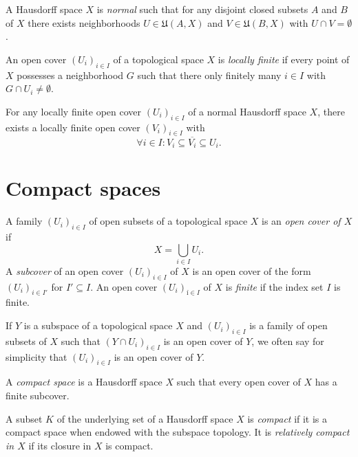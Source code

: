 \begin{dfn}
  A Hausdorff space $X$ is \emph{normal} such that for any disjoint closed
  subsets $A$ and $B$ of $X$ there exists neighborhoods $U \in \mathfrak U(A, X)$
  and $V \in \mathfrak U(B, X)$ with $U \cap V = \emptyset$.
\end{dfn}

An open cover $(U_i)_{i \in I}$ of a topological space $X$ is \emph{locally finite}
if every point of $X$ possesses a neighborhood $G$ such that there only finitely
many $i \in I$ with $G \cap U_i \neq \emptyset$.
\begin{thm}
  \label{prop:shrinking_lemma}
  For any locally finite open cover $(U_i)_{i \in I}$ of a normal Hausdorff space $X$, there
  exists a locally finite open cover $(V_i)_{i \in I}$ with
  \[
    \forall i \in I : V_i \subseteq \overline{V_i} \subseteq U_i.
  \]
\end{thm}



\section{Compact spaces}
\label{sec:compact}

A family $(U_i)_{i \in I}$ of open subsets of a topological space $X$ is an
\emph{open cover of $X$} if
\[
  X = \bigcup_{i \in I} U_i.
\]
A \emph{subcover} of an open cover $(U_i)_{i \in I}$ of $X$
is an open cover of the form $(U_i)_{i \in I'}$ for $I' \subseteq I$. An open
cover $(U_i)_{í \in I}$ of $X$ is \emph{finite} if the index set $I$ is finite.

If $Y$ is a subspace of a topological space $X$ and $(U_i)_{i \in I}$ is a family
of open subsets of $X$ such that $(Y \cap U_i)_{i \in I}$ is an open cover of
$Y$, we often say for simplicity that $(U_i)_{i \in I}$ is an open cover of $Y$.

\begin{dfn}
  A \emph{compact space} is a Hausdorff space $X$ such that every open cover of
  $X$ has a finite subcover.
\end{dfn}

A subset $K$ of the underlying set of a Hausdorff space $X$ is \emph{compact}
if it is a compact space when endowed with the subspace topology. It is \emph{relatively
compact in $X$} if its closure in $X$ is compact.

